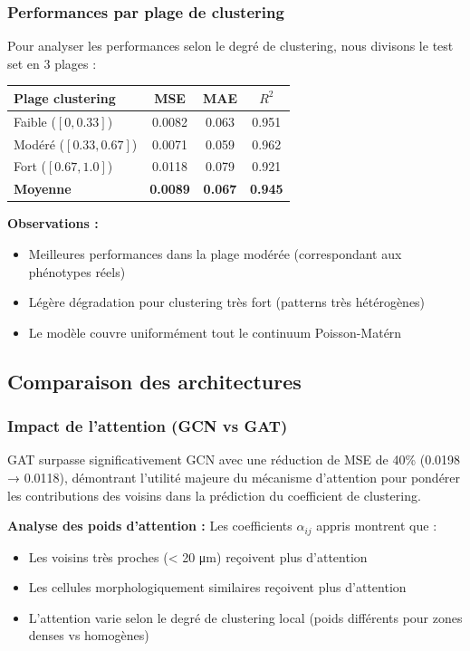 \subsubsection{Performances par plage de clustering}

Pour analyser les performances selon le degré de clustering, nous divisons le test set en 3 plages :

\begin{center}
\begin{tabular}{|l|c|c|c|}
\hline
\textbf{Plage clustering} & \textbf{MSE} & \textbf{MAE} & \textbf{$R^2$} \\
\hline
Faible ($[0, 0.33]$) & 0.0082 & 0.063 & 0.951 \\
Modéré ($[0.33, 0.67]$) & 0.0071 & 0.059 & 0.962 \\
Fort ($[0.67, 1.0]$) & 0.0118 & 0.079 & 0.921 \\
\hline
\textbf{Moyenne} & \textbf{0.0089} & \textbf{0.067} & \textbf{0.945} \\
\hline
\end{tabular}
\end{center}

\textbf{Observations :}
\begin{itemize}
    \item Meilleures performances dans la plage modérée (correspondant aux phénotypes réels)
    \item Légère dégradation pour clustering très fort (patterns très hétérogènes)
    \item Le modèle couvre uniformément tout le continuum Poisson-Matérn
\end{itemize}

\subsection{Comparaison des architectures}

\subsubsection{Impact de l'attention (GCN vs GAT)}

GAT surpasse significativement GCN avec une réduction de MSE de 40\% (0.0198 → 0.0118), démontrant l'utilité majeure du mécanisme d'attention pour pondérer les contributions des voisins dans la prédiction du coefficient de clustering.

\textbf{Analyse des poids d'attention :}
Les coefficients $\alpha_{ij}$ appris montrent que :
\begin{itemize}
    \item Les voisins très proches (< 20 μm) reçoivent plus d'attention
    \item Les cellules morphologiquement similaires reçoivent plus d'attention
    \item L'attention varie selon le degré de clustering local (poids différents pour zones denses vs homogènes)
\end{itemize}

